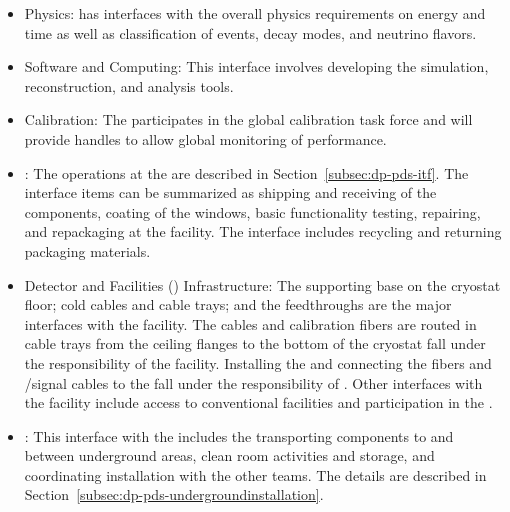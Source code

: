 \begin{itemize}
\item \dune Physics: \dual {} has interfaces with the overall physics requirements on energy and time as well as classification of events, decay modes, and neutrino flavors.

\item Software and Computing: This interface involves developing the simulation, reconstruction, and analysis tools.

\item Calibration: The  participates in the  global calibration task force and will provide handles to allow global monitoring of  performance.

\item {}: The operations at the  are described in Section~\ref{subsec:dp-pds-itf}. The interface items can be summarized as shipping and receiving of the  components,  coating of the  windows, basic functionality testing, repairing, and repackaging at the facility. The interface includes recycling and returning packaging materials.

\item Detector and Facilities () Infrastructure: The 
 supporting base on the cryostat floor; cold cables and cable trays; and the feedthroughs are the major interfaces with the facility. The cables and calibration fibers are routed in cable trays from the ceiling \fdth flanges to the bottom of the cryostat fall under the responsibility of the facility. Installing the  and connecting the fibers and /signal cables to the  fall under the responsibility of . Other interfaces with the facility include access to conventional facilities and participation in the . 

\item {}: This interface with the  includes the transporting  components to and between underground areas, clean room activities and storage, and coordinating installation with the other teams. The details are described in Section~\ref{subsec:dp-pds-undergroundinstallation}.

\end{itemize}

